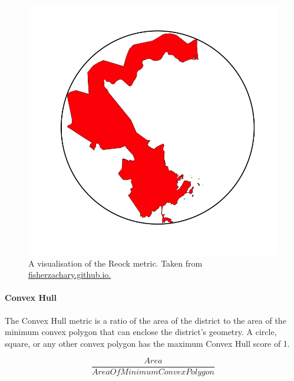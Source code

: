 \documentclass[]{article}
\let\oldparagraph\paragraph
\renewcommand{\paragraph}[1]{\oldparagraph{#1}\mbox{}}
\begin{document}
\begin{figure}
\centering
\includegraphics{img/reock.png}
\caption{A visualisation of the Reock metric. Taken from
\href{https://fisherzachary.github.io/public/r-output.html}{fisherzachary.github.io.}}
\end{figure}

\hypertarget{convex-hull}{%
\paragraph{Convex Hull}\label{convex-hull}}

The Convex Hull metric is a ratio of the area of the district to the
area of the minimum convex polygon that can enclose the district's
geometry. A circle, square, or any other convex polygon has the maximum
Convex Hull score of 1.

\[\frac{Area}{AreaOfMinimumConvexPolygon}\]
\end{document}
